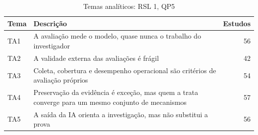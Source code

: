 \begin{table}[htbp]
\centering
\caption{Temas analíticos: RSL 1, QP5}
\label{tab:temas-A3}
\small
\begin{tabular}{lp{11cm}r}
\hline
\textbf{Tema} & \textbf{Descrição} & \textbf{Estudos} \\
\hline
TA1 & A avaliação mede o modelo, quase nunca o trabalho do investigador & 56 \\
TA2 & A validade externa das avaliações é frágil & 42 \\
TA3 & Coleta, cobertura e desempenho operacional são critérios de avaliação próprios & 54 \\
TA4 & Preservação da evidência é exceção, mas quem a trata converge para um mesmo conjunto de mecanismos & 57 \\
TA5 & A saída da IA orienta a investigação, mas não substitui a prova & 56 \\
\hline
\end{tabular}
\end{table}
